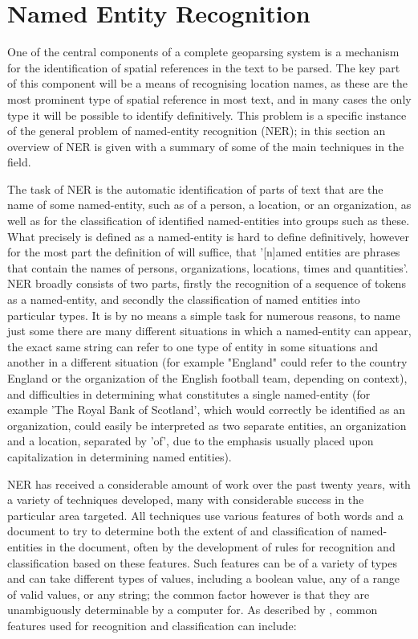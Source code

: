 \documentclass[12pt, a4paper]{report}
\begin{document}
\section{Named Entity Recognition}
\label{sec_ner}

One of the central components of a complete geoparsing system is a mechanism for the identification of spatial references in the text to be parsed. The key part of this component will be a means of recognising location names, as these are the most prominent type of spatial reference in most text, and in many cases the only type it will be possible to identify definitively. This problem is a specific instance of the general problem of named-entity recognition (NER); in this section an overview of NER is given with a summary of some of the main techniques in the field.

The task of NER is the automatic identification of parts of text that are the name of some named-entity, such as of a person, a location, or an organization, as well as for the classification of identified named-entities into groups such as these. What precisely is defined as a named-entity is hard to define definitively, however for the most part the definition of \citet{conll2002} will suffice, that '[n]amed entities are phrases that contain the names of persons, organizations, locations, times and quantities'. NER broadly consists of two parts, firstly the recognition of a sequence of tokens as a named-entity, and secondly the classification of named entities into particular types. It is by no means a simple task for numerous reasons, to name just some there are many different situations in which a named-entity can appear, the exact same string can refer to one type of entity in some situations and another in a different situation (for example "England" could refer to the country England or the organization of the English football team, depending on context), and difficulties in determining what constitutes a single named-entity (for example 'The Royal Bank of Scotland', which would correctly be identified as an organization, could easily be interpreted as two separate entities, an organization and a location, separated by 'of', due to the emphasis usually placed upon capitalization in determining named entities).

NER has received a considerable amount of work over the past twenty years, with a variety of techniques developed, many with considerable success in the particular area targeted. All techniques use various features of both words and a document to try to determine both the extent of and classification of named-entities in the document, often by the development of rules for recognition and classification based on these features. Such features can be of a variety of types and can take different types of values, including a boolean value, any of a range of valid values, or any string; the common factor however is that they are unambiguously determinable by a computer for. As described by \citet{nadeau2009}, common features used for recognition and classification can include:
\end{document}
